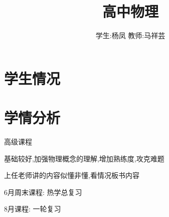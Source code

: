 \documentclass{article}
\title{高中物理}
\author{学生:\quad 杨凤 \quad 教师:\quad 马祥芸}
\begin{document}
    \maketitle
    \tableofcontents
    \newpage

    \section{学生情况}
    \begin{center}
    \end{center}
        
    \section{学情分析}
    高级课程

    基础较好,加强物理概念的理解,增加熟练度,攻克难题

    上任老师讲的内容似懂非懂,看情况板书内容

    6月周末课程:
    热学总复习

    8月课程:
    一轮复习
\end{document}
